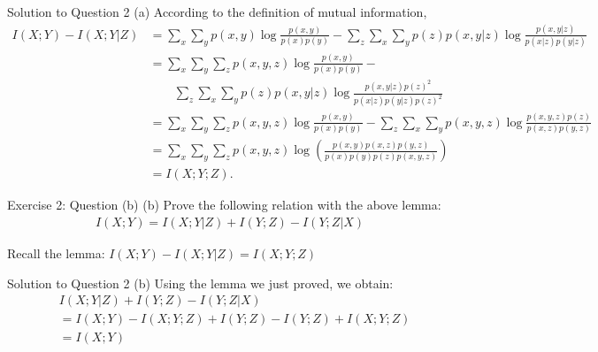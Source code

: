 \documentclass[aspectratio=169]{beamer}
\newcommand{\IXY}{I(X;Y)}
\begin{document}
\begin{frame}{Solution to Question 2 (a)}
	\small
	According to the definition of mutual information, 
	\begin{align*}
		I(X; Y) - I(X; Y | Z) 
		&= \sum_x \sum_y p(x, y) \log \frac{p(x, y)}{p(x) p(y)} - \sum_z \sum_x \sum_y p(z) p(x, y |z) \log \frac{p(x, y | z)}{p(x|z) p(y|z)} \\
		&= \sum_x \sum_y \sum_z p(x,y,z) \log \frac{p(x, y)}{p(x) p(y)} - \\
		& \qquad \sum_z \sum_x \sum_y p(z) p(x, y |z) \log \frac{p(x, y | z) p(z)^2}{p(x|z) p(y|z) p(z)^2} \\
		&= \sum_x \sum_y \sum_z p(x,y,z) \log \frac{p(x, y)}{p(x) p(y)} - \sum_z \sum_x \sum_y p(x, y, z) \log \frac{p(x, y, z) p(z)}{p(x, z) p(y,z)} \\
		&= \sum_x \sum_y \sum_z p(x,y,z) \log \left(\frac{p(x, y) p(x, z) p(y,z)}{p(x) p(y) p(z) p(x,y,z)} \right) \\
		&= I(X;Y;Z). 
	\end{align*}
\end{frame}

\begin{frame}{Exercise 2: Question (b)}
(b) Prove the following relation with the above lemma:
\begin{align*}
	I(X; Y) = I(X; Y |Z) + I(Y; Z) - I(Y; Z | X)
\end{align*}

Recall the lemma: $I(X; Y) - I(X; Y | Z)  = I(X; Y; Z)$

	
\end{frame}

\begin{frame}{Solution to Question 2 (b)}
	Using the lemma we just proved, we obtain:
	\begin{align*}
		& I(X; Y |Z) + I(Y; Z) - I(Y; Z | X) \\
		&= \IXY - I(X; Y; Z)  + I(Y; Z) - I(Y;Z) + I(X;Y;Z) \\
		&= \IXY 
	\end{align*}
\end{frame}
\end{document}

